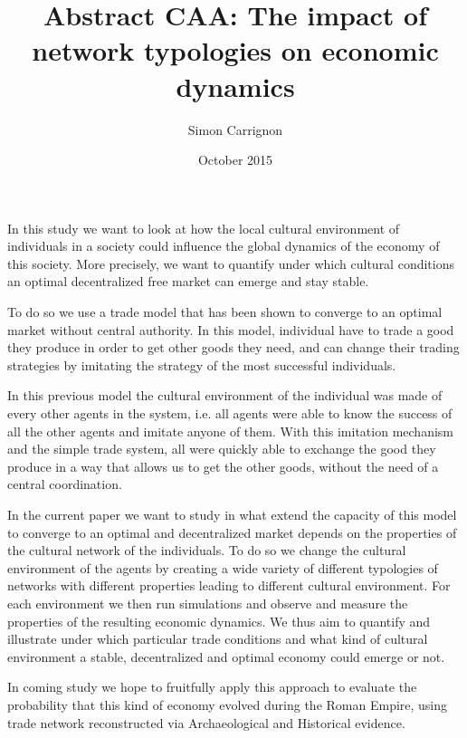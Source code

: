 \documentclass[a4paper]{article}
\title{Abstract CAA: The impact of network typologies on economic dynamics}
\author{Simon Carrignon}
\date{October 2015}
\begin{document}
In this study we want to look at how the local cultural environment of individuals in a society could influence the global dynamics of the economy of this society. More precisely, we want to quantify under which cultural conditions an optimal decentralized free market can emerge and stay stable.

To do so we use a trade model that has been shown to converge to an optimal market without central authority. In this model, individual have to trade a good they produce in order to get other goods they need, and can change their trading strategies by imitating the strategy of the most successful individuals. 

In this previous model the cultural environment of the individual was made of every other agents in the system,  i.e. all agents were able to know the success of all the other agents and imitate anyone of them. With this imitation mechanism and the simple trade system, all were quickly able to exchange the good they produce in a way that allows us to get the other goods, without the need of a central coordination. 

In the current paper we want to study in what extend the capacity of this model to converge to an optimal and decentralized market depends on the properties of the cultural network of the individuals. To do so we change the cultural environment of the agents by creating a wide variety of different typologies of networks with different properties leading to different cultural environment. For each environment we then run simulations and observe and measure the properties of the resulting economic dynamics. We thus aim to quantify and illustrate under which particular trade conditions and what kind of cultural environment a stable, decentralized and optimal economy could emerge or not. %

In coming study we hope to fruitfully apply this approach to evaluate the probability that this kind of economy evolved during the Roman Empire, using trade network reconstructed via Archaeological and Historical evidence. 
\end{document}
